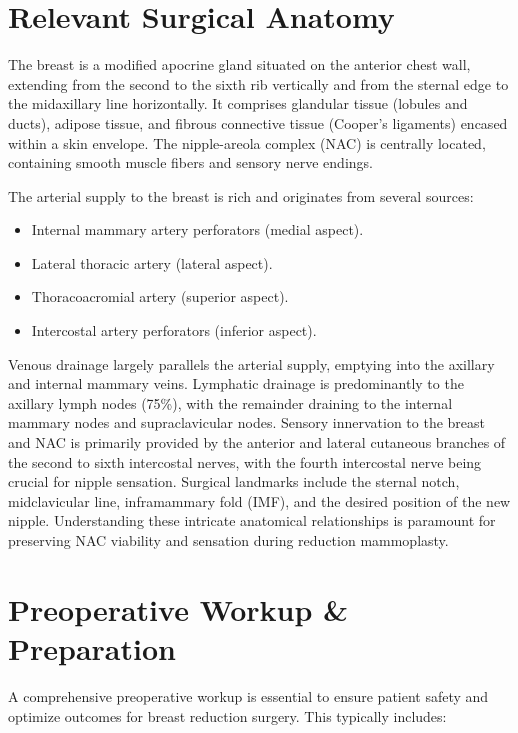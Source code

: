 \section*{Relevant Surgical Anatomy}
The breast is a modified apocrine gland situated on the anterior chest wall, extending from the second to the sixth rib vertically and from the sternal edge to the midaxillary line horizontally. It comprises glandular tissue (lobules and ducts), adipose tissue, and fibrous connective tissue (Cooper's ligaments) encased within a skin envelope. The nipple-areola complex (NAC) is centrally located, containing smooth muscle fibers and sensory nerve endings.

The arterial supply to the breast is rich and originates from several sources:
\begin{itemize}
  \item Internal mammary artery perforators (medial aspect).
  \item Lateral thoracic artery (lateral aspect).
  \item Thoracoacromial artery (superior aspect).
  \item Intercostal artery perforators (inferior aspect).
\end{itemize}
Venous drainage largely parallels the arterial supply, emptying into the axillary and internal mammary veins. Lymphatic drainage is predominantly to the axillary lymph nodes (75\%), with the remainder draining to the internal mammary nodes and supraclavicular nodes. Sensory innervation to the breast and NAC is primarily provided by the anterior and lateral cutaneous branches of the second to sixth intercostal nerves, with the fourth intercostal nerve being crucial for nipple sensation. Surgical landmarks include the sternal notch, midclavicular line, inframammary fold (IMF), and the desired position of the new nipple. Understanding these intricate anatomical relationships is paramount for preserving NAC viability and sensation during reduction mammoplasty.

\section*{Preoperative Workup \& Preparation}
A comprehensive preoperative workup is essential to ensure patient safety and optimize outcomes for breast reduction surgery. This typically includes:


